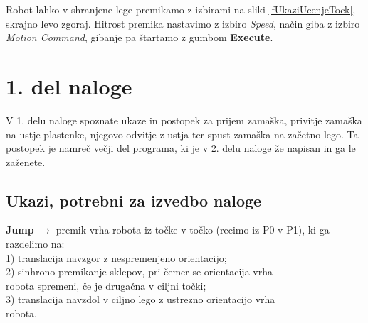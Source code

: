 Robot lahko v shranjene lege premikamo z izbirami na sliki
\ref{fUkaziUcenjeTock}, skrajno levo zgoraj. Hitrost premika
nastavimo z izbiro \emph{Speed}, način giba z izbiro \emph{Motion
Command}, gibanje pa štartamo z gumbom \textbf{Execute}.


\vspace{0.0cm} %
\section{1. del naloge}

V 1. delu naloge spoznate ukaze in postopek za prijem zamaška,
privitje zamaška na ustje plastenke, njegovo odvitje z ustja ter
spust zamaška na začetno lego. Ta postopek je namreč večji del
programa, ki je v 2. delu naloge že napisan in ga le zaženete.

\subsection{Ukazi, potrebni za izvedbo naloge}
\vspace{0.3cm}

\begin{mdframed}[backgroundcolor=green!20, shadow=true,roundcorner=8pt]
        \vspace{0.2cm}
\textbf{Jump} $\longrightarrow$ premik vrha robota iz točke v točko (recimo iz P0 v P1), ki ga \\
\hspace*{1.6cm}  razdelimo na: \vspace*{0.3cm} \\ %
\hspace*{1.6cm} 1) translacija navzgor z nespremenjeno orientacijo; \\ %
\hspace*{1.6cm} 2) sinhrono premikanje sklepov, pri čemer se orientacija vrha \\ %
\hspace*{2.05cm} robota spremeni, če je drugačna v ciljni točki; \\ %
\hspace*{1.6cm} 3) translacija navzdol v ciljno lego z ustrezno orientacijo vrha \\%
\hspace*{2.05cm} robota. %
        \vspace{0.2cm}
\end{mdframed}

